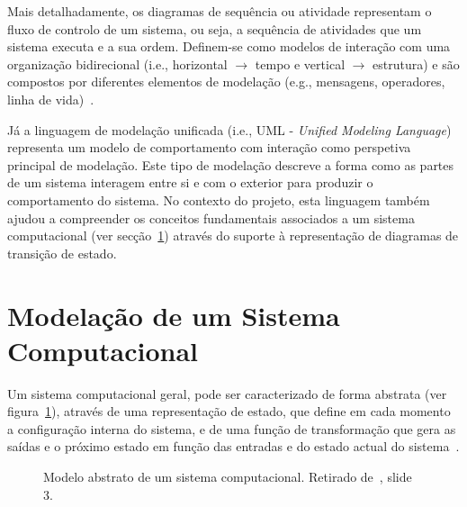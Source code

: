 Mais detalhadamente, os diagramas de sequência ou atividade representam o fluxo de controlo de um sistema, ou seja, a sequência de atividades que um sistema executa e a sua ordem. Definem-se como modelos de interação com uma organização bidirecional (i.e., horizontal $\rightarrow$ tempo e vertical $\rightarrow$ estrutura) e são compostos por diferentes elementos de modelação (e.g., mensagens, operadores, linha de vida)~\cite{isel:iasa:slides:intro-eng-soft-parte-2}.

Já a linguagem de modelação unificada (i.e., UML - \textit{Unified Modeling Language}) representa um modelo de comportamento com interação como perspetiva principal de modelação.
Este tipo de modelação descreve a forma como as partes de um sistema interagem entre si e com o exterior para produzir o comportamento do sistema.
No contexto do projeto, esta linguagem também ajudou a compreender os conceitos fundamentais associados a um sistema computacional (ver secção~\ref{sec:modelacao-de-um-sistema-computacional}) através do suporte à representação de diagramas de transição de estado.


\section{Modelação de um Sistema Computacional}\label{sec:modelacao-de-um-sistema-computacional}

Um sistema computacional geral, pode ser caracterizado de forma abstrata (ver figura~\ref{fig:sistema-computacional-abstrato}), através de uma representação de estado, que define em cada momento a configuração interna do
sistema, e de uma função de transformação que gera as saídas e o próximo estado em
função das entradas e do estado actual do sistema~\cite{isel:iasa:slides:intro-eng-soft-parte-3}.

\begin{figure}[H]
    \begin{center}
    \end{center}
    \caption{Modelo abstrato de um sistema computacional.
    Retirado de~\cite{isel:iasa:slides:intro-eng-soft-parte-3}, slide 3.}\label{fig:sistema-computacional-abstrato}
\end{figure}

